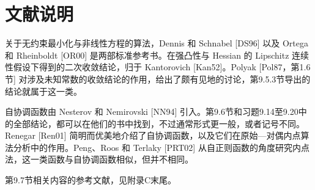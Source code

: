 \section*{文献说明}
关于无约束最小化与非线性方程的算法，Dennis 和 Schnabel [DS96] 以及 Ortega 和 Rheinboldt [OR00] 是两部标准参考书。在强凸性与 Hessian 的 Lipschitz 连续性假设下得到的二次收敛结论，归于 Kantorovich [Kan52]。Polyak [Pol87，第1.6节] 对涉及未知常数的收敛结论的作用，给出了颇有见地的讨论，第9.5.3节导出的结论就属于这一类。

自协调函数由 Nesterov 和 Nemirovski [NN94] 引入。第9.6节和习题9.14至9.20中的全部结论，都可以在他们的书中找到，不过通常形式更一般，或者记号不同。Renegar [Ren01] 简明而优美地介绍了自协调函数，以及它们在原始—对偶内点算法分析中的作用。Peng、Roos 和 Terlaky [PRT02] 从自正则函数的角度研究内点法，这一类函数与自协调函数相似，但并不相同。

第9.7节相关内容的参考文献，见附录C末尾。
